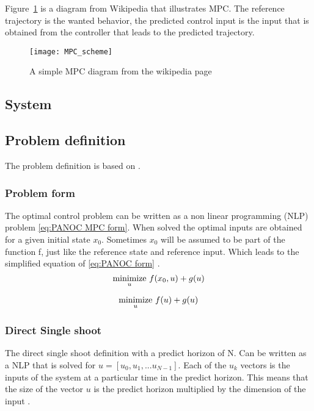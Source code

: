 	Figure~\ref{fig:MPC diagram} is a diagram from Wikipedia \cite{Wikipedia} that illustrates MPC. The reference trajectory is the wanted behavior, the predicted control input is the input that is obtained from the controller that leads to the predicted trajectory.
	\begin{figure}[h]
		\centering
		\texttt{[image: MPC\_scheme]}
		\caption{A simple MPC diagram from the wikipedia page \cite{Wikipedia}}
		\label{fig:MPC diagram}
	\end{figure}
			
	\subsection{System}
		
	\subsection{Problem definition}
	The problem definition is based on \cite{Diehl2005}.
		\subsubsection{Problem form}
			The optimal control problem can be written as a non linear programming (NLP) problem  \eqref{eq:PANOC MPC form}. When solved the optimal inputs are obtained for a given initial state $x_0$. Sometimes $x_0$ will be assumed to be part of the function f, just like the reference state and reference input. Which leads to the simplified equation of \eqref{eq:PANOC form} .
			\begin{equation}
				\underset{u}{\operatorname*{minimize}} \  f(x_0,u) + g(u)
				\label{eq:PANOC MPC form}
			\end{equation}
			
			\begin{equation}
				\underset{u}{\operatorname*{minimize}} \  f(u) + g(u)
				\label{eq:PANOC form}
			\end{equation}
		\subsubsection{Direct Single shoot}
			The direct single shoot definition with a predict horizon of N. Can be written as a NLP that is solved for $u=[u_0,u_1,... u_{N-1}]$. Each of the $u_k$ vectors is the inputs of the system at a particular time in the predict horizon. This means that the size of the vector $u$ is the predict horizon multiplied by the dimension of the input .
			
